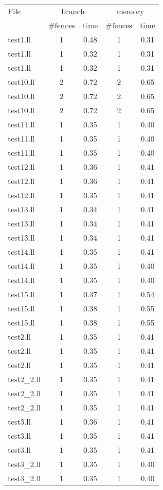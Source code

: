 \begin{tabular}{l|c|c|c|c|}
\toprule
File & \multicolumn{2}{c|}{branch} & \multicolumn{2}{c|}{memory} \\
& \#fences & time & \#fences & time\\
\midrule
test1.ll & 1 & 0.48 & 1 & 0.31\\
test1.ll & 1 & 0.32 & 1 & 0.31\\
test1.ll & 1 & 0.32 & 1 & 0.31\\
test10.ll & 2 & 0.72 & 2 & 0.65\\
test10.ll & 2 & 0.72 & 2 & 0.65\\
test10.ll & 2 & 0.72 & 2 & 0.65\\
test11.ll & 1 & 0.35 & 1 & 0.40\\
test11.ll & 1 & 0.35 & 1 & 0.40\\
test11.ll & 1 & 0.35 & 1 & 0.40\\
test12.ll & 1 & 0.36 & 1 & 0.41\\
test12.ll & 1 & 0.36 & 1 & 0.41\\
test12.ll & 1 & 0.35 & 1 & 0.41\\
test13.ll & 1 & 0.34 & 1 & 0.41\\
test13.ll & 1 & 0.34 & 1 & 0.41\\
test13.ll & 1 & 0.34 & 1 & 0.41\\
test14.ll & 1 & 0.35 & 1 & 0.41\\
test14.ll & 1 & 0.35 & 1 & 0.40\\
test14.ll & 1 & 0.35 & 1 & 0.40\\
test15.ll & 1 & 0.37 & 1 & 0.54\\
test15.ll & 1 & 0.38 & 1 & 0.55\\
test15.ll & 1 & 0.38 & 1 & 0.55\\
test2.ll & 1 & 0.35 & 1 & 0.41\\
test2.ll & 1 & 0.35 & 1 & 0.41\\
test2.ll & 1 & 0.35 & 1 & 0.41\\
test2\_2.ll & 1 & 0.35 & 1 & 0.41\\
test2\_2.ll & 1 & 0.35 & 1 & 0.41\\
test2\_2.ll & 1 & 0.35 & 1 & 0.41\\
test3.ll & 1 & 0.36 & 1 & 0.41\\
test3.ll & 1 & 0.35 & 1 & 0.41\\
test3.ll & 1 & 0.35 & 1 & 0.41\\
test3\_2.ll & 1 & 0.35 & 1 & 0.40\\
test3\_2.ll & 1 & 0.35 & 1 & 0.40\\

\end{tabular}
